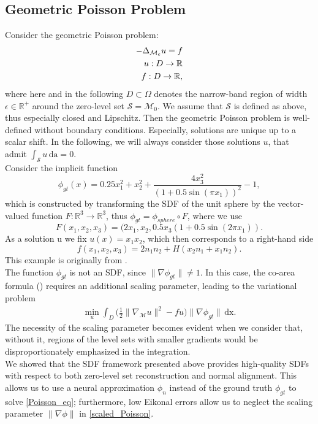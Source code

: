 \documentclass[12pt,openany]{book}
\newcommand{\R}{\mathbb{R}}
\def\S{\mathcal{S}}
\theoremstyle{plainnormal}
\theoremstyle{remark}
\begin{document}
\subsection{Geometric Poisson Problem}\label{section_PoissonPB}
Consider the geometric Poisson problem: \begin{align}\label{Poisson_eq}
    -\Delta_{\mathcal{M}_c} u = f\\
    u: D \rightarrow \R \notag\\
    f: D \rightarrow\R, \notag
\end{align} 
where here and in the following $ D\subset \Omega$ denotes the narrow-band region of width $\epsilon \in\R^+$ around the zero-level set $\S =\mathcal{M}_{ 0}$. We assume that $\mathcal S$ is defined as above, thus especially closed and Lipschitz. Then the geometric Poisson problem is well-defined without boundary conditions. Especially, solutions are unique up to a scalar shift. In the following, we will always consider those solutions $u$, that admit $\int_\S u\, \mathrm{da} = 0$. 
\\
Consider the implicit function 
$$\phi_{gt}(x) = 0.25x_1^2 + x_2^2 + \frac{4x_3^2}{(1+0.5\sin(\pi x_1))^2} - 1,$$
which is constructed by transforming the SDF of the unit sphere by the vector-valued function $F: \R^3 \rightarrow \R^3$, thus $\phi_{gt} = \phi_{sphere} \circ F$, where we use $$F(x_1, x_2,x_3) = (2x_1, x_2, 0.5x_3(1+0.5\sin(2\pi x_1)).$$
As a solution u we fix $u(x) = x_1x_2$, which then corresponds to a right-hand side $$f(x_1, x_2, x_3) = 2n_1n_2 + H(x_2n_1 + x_1n_2).$$ This example is originally from \cite{Dziuk_Elliott_2013}.\\
The function $\phi_{gt}$ is not an SDF, since $\|\nabla\phi_{gt}\| \neq 1$. In this case, the co-area formula () requires an additional scaling parameter, leading to the variational problem 
\begin{align}
    \min_u\int_D \Big(\frac{1}{2}\|\nabla_\mathcal{M}u\|^2 - fu\Big) \|\nabla \phi_{gt}\| \,\mathrm{dx}.\label{scaled_Poisson}
\end{align}
The necessity of the scaling parameter becomes evident when we consider that, without it, regions of the level sets with smaller gradients would be disproportionately emphasized in the integration.\\
We showed that the SDF framework presented above provides high-quality SDFs with respect to both zero-level set reconstruction and normal alignment. This allows us to use a neural approximation $\phi_n$ instead of the ground truth $\phi_{gt}$ to solve \cref{Poisson_eq}; furthermore, low Eikonal errors allow us to neglect the scaling parameter $\|\nabla \phi\|$ in \cref{scaled_Poisson}. \\
\end{document}
